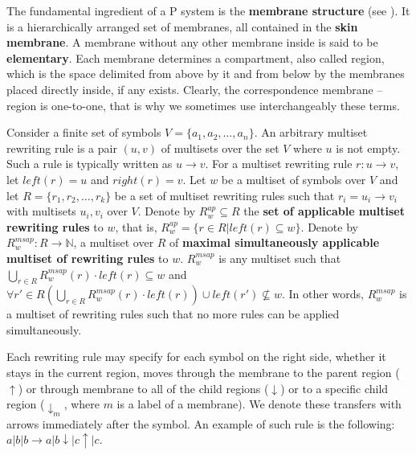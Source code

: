 \documentclass[llncs,submission,copyright,creativecommons]{../lib/lncs/llncs}
\begin{document}


The fundamental ingredient of a P system is the {\bf membrane structure} (see \cite{Paun2006Introduction}). It is a hierarchically arranged set of membranes, all contained in the {\bf skin membrane}. A membrane without any other membrane inside is said to be {\bf elementary}. Each membrane determines a compartment, also called region, which is the space delimited from above by it and from below by the membranes placed directly inside, if any exists. Clearly, the correspondence membrane – region is one-to-one, that is why we sometimes use interchangeably these terms.


Consider a finite set of symbols $V=\{a_1, a_2,\dots, a_n\}$. An arbitrary multiset rewriting rule is a pair $(u, v)$ of multisets over the set $V$ where $u$ is not empty. Such a rule is typically written as $u\rightarrow v$. For a multiset rewriting rule $r : u\rightarrow v$, let $left(r) = u$ and $right(r) = v$. Let $w$ be a multiset of symbols over $V$ and let $R=\{r_1, r_2,\dots, r_k\}$ be a set of multiset rewriting rules such that $r_i = u_i\rightarrow v_i$ with multisets $u_i, v_i$ over $V$. Denote by $R^{ap}_w\subseteq R$ the {\bf set of applicable multiset rewriting rules} to $w$, that is, $R^{ap}_w = \{r\in R|left(r)\subseteq w\}$. Denote by $R^{msap}_w: R\rightarrow \mathbb N$, a multiset over $R$ of {\bf maximal simultaneously applicable multiset of rewriting rules} to $w$. $R^{msap}_w$ is any multiset such that $\displaystyle\bigcup_{r\in R} R^{msap}_w(r)\cdot left(r)\subseteq w$ and $\forall r'\in R \left(\displaystyle\bigcup_{r\in R} R^{msap}_w(r)\cdot left(r)\right)\cup left(r')\nsubseteq w$. In other words, $R^{msap}_w$ is a multiset of rewriting rules such that no more rules can be applied simultaneously.



  
Each rewriting rule may specify for each symbol on the right side,
whether it stays in the current region,
moves through the membrane to the parent region ($\uparrow$)
or through membrane to all of the child regions ($\downarrow$)
or to a specific child region ($\downarrow_m$, where $m$ is a label of a membrane).
We denote these transfers with arrows immediately after the symbol.
An example of such rule is the following: $a|b|b\rightarrow a|b\downarrow |c\uparrow|c$.
\end{document}
